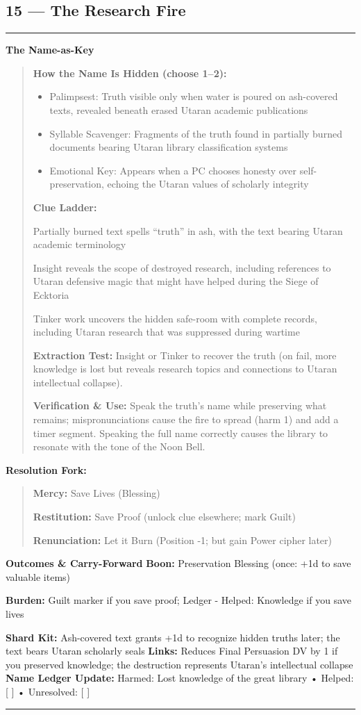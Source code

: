 \documentclass[18pt, letterpaper, twoside]{article}
\newenvironment{floorbox}[1]{%
    \begin{center}
    \begin{minipage}{0.95\textwidth}
    \subsection*{#1}
    \vspace{-0.5em}
    \rule{\textwidth}{0.5pt}
    \vspace{0.5em}
}{%
    \vspace{0.5em}
    \rule{\textwidth}{0.5pt}
    \end{minipage}
    \end{center}
}
\newenvironment{gmnote}[1]{%
    \vspace{0.5em}
    \noindent\textbf{#1}
    \begin{quote}
}{%
    \end{quote}
    \vspace{0.5em}
}
\newenvironment{resolutionbox}{%
    \vspace{0.5em}
    \noindent\textbf{Resolution Fork:}
    \begin{quote}
}{%
    \end{quote}
    \vspace{0.5em}
}
\newcommand{\boon}[1]{\noindent\textbf{Boon:} #1\par}
\newcommand{\burden}[1]{\noindent\textbf{Burden:} #1\par}
\begin{document}
\begin{floorbox}{15 --- The Research Fire}
\begin{gmnote}{The Name-as-Key}
\textbf{How the Name Is Hidden (choose 1--2):}
\begin{itemize}[leftmargin=*]
    \item Palimpsest: Truth visible only when water is poured on ash-covered texts, revealed beneath erased Utaran academic publications
    \item Syllable Scavenger: Fragments of the truth found in partially burned documents bearing Utaran library classification systems
    \item Emotional Key: Appears when a PC chooses honesty over self-preservation, echoing the Utaran values of scholarly integrity
\end{itemize}

\textbf{Clue Ladder:}
\begin{description}[leftmargin=*, style=unboxed]
    \item[Gentle Nudge:] Partially burned text spells ``truth'' in ash, with the text bearing Utaran academic terminology
    \item[Actionable Lead:] Insight reveals the scope of destroyed research, including references to Utaran defensive magic that might have helped during the Siege of Ecktoria
    \item[Aha! Proof:] Tinker work uncovers the hidden safe-room with complete records, including Utaran research that was suppressed during wartime
\end{description}

\textbf{Extraction Test:} Insight or Tinker to recover the truth (on fail, more knowledge is lost but reveals research topics and connections to Utaran intellectual collapse).

\textbf{Verification \& Use:} Speak the truth's name while preserving what remains; mispronunciations cause the fire to spread (harm 1) and add a timer segment. Speaking the full name correctly causes the library to resonate with the tone of the Noon Bell.
\end{gmnote}

\begin{resolutionbox}
\textbf{Mercy:} Save Lives (Blessing)

\textbf{Restitution:} Save Proof (unlock clue elsewhere; mark Guilt)

\textbf{Renunciation:} Let it Burn (Position -1; but gain Power cipher later)
\end{resolutionbox}

\textbf{Outcomes \& Carry-Forward}
\boon{Preservation Blessing (once: +1d to save valuable items)}
\burden{Guilt marker if you save proof; Ledger - Helped: Knowledge if you save lives}
\textbf{Shard Kit:} Ash-covered text grants +1d to recognize hidden truths later; the text bears Utaran scholarly seals
\textbf{Links:} Reduces Final Persuasion DV by 1 if you preserved knowledge; the destruction represents Utaran's intellectual collapse
\textbf{Name Ledger Update:} Harmed: Lost knowledge of the great library • Helped: [ ] • Unresolved: [ ]


\end{floorbox}
\end{document}
